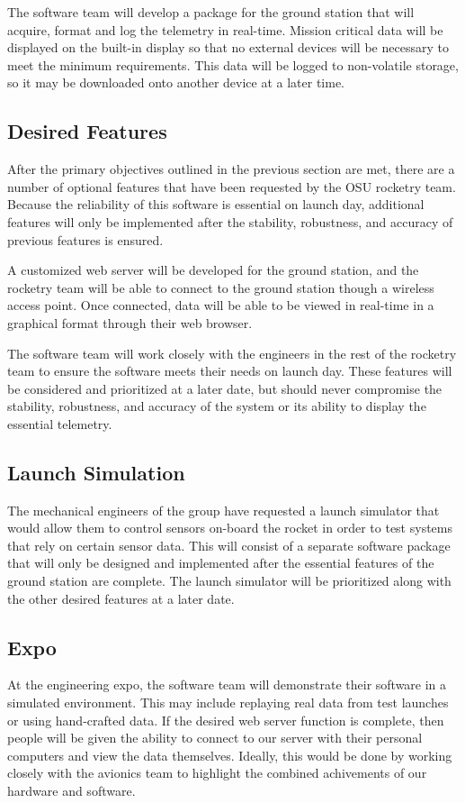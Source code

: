 \documentclass[10pt,journal,draftclsnofoot,onecolumn]{IEEEtran}
\begin{document}
	The software team will develop a package for the ground station that
	will acquire, format and log the telemetry in real-time.
	Mission critical data will be displayed on the built-in display so that
	no external devices will be necessary to meet the minimum requirements.
	This data will be logged to non-volatile storage, so it may be
	downloaded onto another device at a later time.
	
	\subsection{Desired Features}

	After the primary objectives outlined in the previous section
	are met, there are a number of optional features
	that have been requested by the \ac{OSU} rocketry team.
	Because the reliability of this software is essential on launch day,
	additional features will only be implemented after
	the stability, robustness, and accuracy of previous features
	is ensured.

	A customized web server will be developed for the ground station,
	and the rocketry team will be able to connect to the ground station
	though a wireless access point. Once connected, data will be able
	to be viewed in real-time in a graphical format through their
	web browser.

	The software team will work closely with the engineers in the
	rest of the rocketry team to ensure the software
	meets their needs on launch day. These features will be considered
	and prioritized at a later date, but should never compromise the stability,
	robustness, and accuracy of the system or its ability
	to display the essential telemetry.
	
	\subsection{Launch Simulation}
	
	The mechanical engineers of the group have requested a launch simulator that
	would allow them to control sensors on-board the rocket in order to test
	systems that rely on certain sensor data. This will consist of a separate
	software package that will only be designed and implemented after the
	essential features of the ground station are complete. The launch simulator
	will be prioritized along with the other desired features at a later date.

	\subsection{Expo}
	At the engineering expo, the software team will demonstrate their software
	in a simulated environment. This may include replaying real data from test launches
	or using hand-crafted data.
	If the desired web server function is complete, then people will be given the ability
	to connect to our server with their personal computers and view the data themselves.
	Ideally, this would be done by working closely
	with the avionics team to highlight the combined achivements of our
	hardware and software.
	
\end{document}
